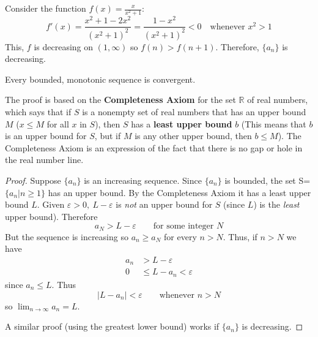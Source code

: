   \begin{solution}[2]
    Consider the function $f(x)=\frac{x}{x^2+1}$:
    $$f'(x)=\frac{x^2+1-2x^2}{(x^2+1)^2} = \frac{1-x^2}{(x^2+1)^2} < 0 \quad \text{whenever } x^2>1$$
    This, $f$ is decreasing on $(1,\infty)$ so $f(n)>f(n+1)$. Therefore, $\{a_n\}$ is decreasing.
  \end{solution}
  \begin{theorem}
    Every bounded, monotonic sequence is convergent.
  \end{theorem}
  The proof is based on the \textbf{Completeness Axiom} for the set $\mathbb{R}$ of real numbers, which says that if $S$ is a nonempty set of real numbers that has an upper bound $M$ ($x \leq M$ for all $x$ in $S$), then $S$ has a \textbf{least upper bound} $b$ (This means that $b$ is an upper bound for $S$, but if $M$ is any other upper bound, then $b \leq M$). The Completeness Axiom is an expression of the fact that there is no gap or hole in the real number line.
  \begin{proof}\let\qed\relax
    Suppose $\{a_n\}$ is an increasing sequence. Since $\{a_n\}$ is bounded, the set S=$\{ a_n|n \geq 1 \}$ has an upper bound. By the Completeness Axiom it has a least upper bound $L$. Given $\varepsilon > 0,\ L-\varepsilon$ is \textit{not} an upper bound for $S$ (since $L$) is the \textit{least} upper bound). Therefore
    $$ a_N > L-\varepsilon \qquad\text{for some integer } N$$
    But the sequence is increasing so $a_n \geq a_N$ for every $n>N$. Thus, if $n>N$ we have
    \begin{align*}
      a_n &> L-\varepsilon \\
      0 &\leq L - a_n < \varepsilon
    \end{align*}
    since $a_n \leq L$. Thus
    $$ |L-a_n| < \varepsilon \qquad\text{whenever } n > N $$
    so $\lim_{n\to\infty} a_n = L$.\par
    A similar proof (using the greatest lower bound) works if $\{a_n\}$ is decreasing.
  \end{proof}